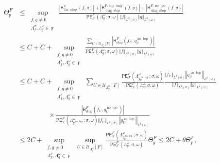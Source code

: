 \documentclass{amsart}%
\theoremstyle{plain}
\numberwithin{equation}{section}
\begin{document}
\begin{align*}
\Theta_{\digamma}^{F}  & \leq\sup_{\substack{f,g\neq0 \\\Lambda_{f}^{\sigma
},\Lambda_{g}^{\omega}\in\digamma}}\frac{\left\vert \mathsf{B}%
_{\operatorname{far}\operatorname*{stop}}^{F}\left(  f,g\right)  \right\vert
+\left\vert \mathsf{B}_{\operatorname{diag}\operatorname*{stop}}%
^{F,\operatorname{top}\operatorname{only}}\left(  f,g\right)  \right\vert
+\left\vert \mathsf{B}_{\operatorname{diag}\operatorname*{stop}}%
^{F,\operatorname*{no}\operatorname{top}}\left(  f,g\right)  \right\vert
}{\mathrm{P}\mathsf{E}_{\mathcal{F}}^{F}\left(  \Lambda_{g}^{\omega}%
;\sigma,\omega\right)  \left\Vert f\right\Vert _{L^{2}(\sigma)}\left\Vert
g\right\Vert _{L^{2}(\omega)}}\\
& \leq C+C+\sup_{\substack{f,g\neq0 \\\Lambda_{f}^{\sigma},\Lambda_{g}%
^{\omega}\in\digamma}}\frac{\sum_{U\in\mathcal{U}_{\Lambda_{g}^{\omega}%
}\left[  F\right]  }\left\vert \mathsf{B}_{\operatorname*{stop}}^{F}\left(
f_{U},g_{U}^{\operatorname*{no}\operatorname{top}}\right)  \right\vert
}{\mathrm{P}\mathsf{E}_{\mathcal{F}}^{F}\left(  \Lambda_{g}^{\omega}%
;\sigma,\omega\right)  \left\Vert f\right\Vert _{L^{2}(\sigma)}\left\Vert
g\right\Vert _{L^{2}(\omega)}}\\
& \leq C+C+\sup_{\substack{f,g\neq0 \\\Lambda_{f}^{\sigma},\Lambda_{g}%
^{\omega}\in\digamma}}\sum_{U\in\mathcal{U}_{\Lambda_{g}^{\omega}}\left[
F\right]  }\frac{\mathrm{P}\mathsf{E}_{\mathcal{F}}^{F}\left(  \Lambda
_{g_{U}^{\operatorname*{no}\operatorname{top}}}^{\omega};\sigma,\omega\right)
}{\mathrm{P}\mathsf{E}_{\mathcal{F}}^{F}\left(  \Lambda_{g}^{\omega}%
;\sigma,\omega\right)  }\frac{\left\Vert f_{U}\right\Vert _{L^{2}(\sigma
)}\left\Vert g_{U}^{\operatorname*{no}\operatorname{top}}\right\Vert
_{L^{2}(\omega)}}{\left\Vert f\right\Vert _{L^{2}(\sigma)}\left\Vert
g\right\Vert _{L^{2}(\omega)}}\\
& \ \ \ \ \ \ \ \ \ \ \ \ \ \ \ \ \ \ \ \ \times\frac{\left\vert
\mathsf{B}_{\operatorname*{stop}}^{F}\left(  f_{U},g_{U}^{\operatorname*{no}%
\operatorname{top}}\right)  \right\vert }{\mathrm{P}\mathsf{E}_{\mathcal{F}%
}^{F}\left(  \Lambda_{g_{U}^{\operatorname*{no}\operatorname{top}}}^{\omega
};\sigma,\omega\right)  \left\Vert f_{U}\right\Vert _{L^{2}(\sigma)}\left\Vert
g_{U}^{\operatorname*{no}\operatorname{top}}\right\Vert _{L^{2}(\omega)}}\\
& \leq2C+\sup_{\substack{f,g\neq0 \\\Lambda_{f}^{\sigma},\Lambda_{g}^{\omega
}\in\digamma}}\sup_{U\in\mathcal{U}_{\Lambda_{g}^{\omega}}\left[  F\right]
}\frac{\mathrm{P}\mathsf{E}_{\mathcal{F}}^{F}\left(  \Lambda_{g_{U}%
^{\operatorname*{no}\operatorname{top}}}^{\omega};\sigma,\omega\right)
}{\mathrm{P}\mathsf{E}_{\mathcal{F}}^{F}\left(  \Lambda_{g}^{\omega}%
;\sigma,\omega\right)  }\Theta_{\digamma}^{F}\leq2C+\theta\Theta_{\digamma
}^{F},
\end{align*}
\end{document}
